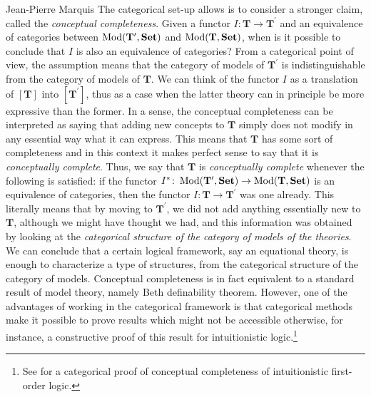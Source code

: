 \begin{artengenv}{Jean-Pierre Marquis}
The categorical set-up allows is to consider a stronger claim, called the \emph{conceptual completeness}. 
Given a functor  \( I:  \mathbf{T} \to \mathbf{T}^{\prime} \) and an equivalence of categories between \( \operatorname{\mathrm{Mod}}(\mathbf{T}^{\prime}, \mathbf{Set}) \) and \( \operatorname{\mathrm{Mod}}(\mathbf{T}, \mathbf{Set}) \), when is it possible to conclude that \( I \) is also an equivalence of categories? From a categorical point of view, the assumption means that the category of models of \( \mathbf{T}^{\prime} \) is indistinguishable from the category of models of \( \mathbf{T} \). We can think of the functor \( I \) as a translation of \( [\mathbf{T}] \) into \( [\mathbf{T}^{\prime}] \), thus as a case when the latter theory can in principle be more expressive than the former. In a sense, the conceptual completeness can be interpreted as saying that adding new concepts to \( \mathbf{T} \) simply does not modify in any essential way what it can express. This means that \( \mathbf{T} \) has some sort of completeness and in this context it makes perfect sense to say that it is \textit{conceptually complete}. Thus, we say that \( \mathbf{T} \) is \textit{conceptually complete} whenever the following is satisfied: if the functor \( I^{\ast}\colon \operatorname{\mathrm{Mod}}(\mathbf{T}^{\prime}, \mathbf{Set}) \rightarrow \operatorname{\mathrm{Mod}}(\mathbf{T}, \mathbf{Set}) \) is an equivalence of categories, then the functor \( I\colon \mathbf{T} \rightarrow \mathbf{T}^{\prime} \) was one already. This literally means that by moving to \( \mathbf{T}^{\prime} \), we did not add anything essentially new to \( \mathbf{T} \), although we might have thought we had, and this information was obtained by looking at the \emph{categorical structure of the category of models of the theories}. We can conclude that a certain logical framework, say an equational theory, is enough to characterize a type of structures, from the categorical structure of the category of models. Conceptual completeness is in fact equivalent to a standard result of model theory, namely Beth definability theorem. However, one of the advantages of working in the categorical framework is that categorical methods make it possible to prove results which might not be accessible otherwise, for instance, a constructive proof of this result for intuitionistic logic.\footnote{See \parencite{Pitts1989} for a categorical proof of conceptual completeness of intuitionistic first-order logic.}



\end{artengenv}
